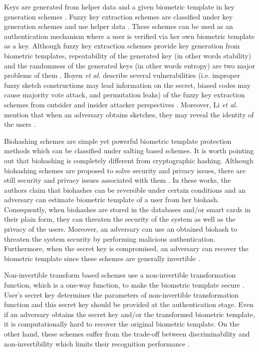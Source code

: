 \documentclass[journal]{IEEEtran}
\begin{document}
Keys are generated from helper data and a given biometric template in key generation schemes \cite{Jain2}. Fuzzy key extraction schemes are classified under key generation schemes and use helper data \cite{Dodis1, Dodis2, Yagiz, Ong, Arakala}. These schemes can be used as an authentication mechanism where a user is verified via her own biometric template as a key. Although fuzzy key extraction schemes provide key generation from biometric templates, repeatability of the generated key (in other words stability) and the randomness of the generated keys (in other words entropy) are two major problems of them \cite{Jain2}. Boyen  \textit{et al.} describe several vulnerabilities (i.e. improper fuzzy sketch constructions may lead information on the secret, biased codes may cause majority vote attack, and permutation leaks) of the fuzzy key extraction schemes from outsider and insider attacker perspectives \cite{Boyen}. Moreover, Li \textit{et al.} mention that when an adversary obtains sketches, they may reveal the identity of the users \cite{Li}.

Biohashing schemes are simple yet powerful biometric template protection methods \cite{Karabat, Bai, Kuan, Rathgeb, Lumini} which can be classified under salting based schemes. It is worth pointing out that biohashing is completely different from cryptographic hashing. Although biohashing schemes are proposed to solve security and privacy issues, there are still security and privacy issues associated with them \cite{Kong, Vielhauer, Cheung, Kummel}. In these works, the authors claim that biohashes can be reversible under certain conditions and an adversary can estimate biometric template of a user from her biohash. Consequently, when biohashes are stored in the databases and/or smart cards in their plain form, they can threaten the security of the system as well as the privacy of the users. Moreover, an adversary can use an obtained biohash to threaten the system security by performing malicious authentication. Furthermore, when the secret key is compromised, an adversary can recover the biometric template since these schemes are generally invertible \cite{Jain2}. 

Non-invertible transform based schemes use a non-invertible transformation function, which is a one-way function, to make the biometric template secure \cite{Sutcu, Jin, Yang}. User's secret key determines the parameters of  non-invertible transformation function and this secret key should be provided at the authentication stage. Even if an adversary obtains the secret key and/or the transformed biometric template, it is computationally hard to recover the original biometric template. On the other hand, these schemes suffer from the trade-off between discriminability and non-invertibility which limits their recognition performance \cite{Jain2}.
\end{document}
